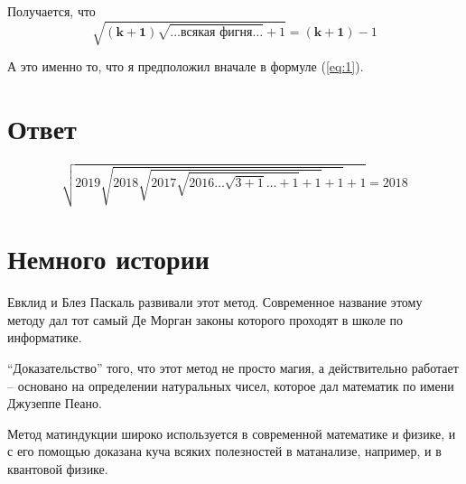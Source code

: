 \documentclass{article}
\begin{document}
Получается, что 
$$\sqrt{\boldsymbol{(k+1)}{}\sqrt{\text{\ldots{}всякая фигня\ldots{}}}+1}=\boldsymbol{(k+1)}-1$$

А это именно то, что я предположил вначале в формуле (\ref{eq:1}).

\section{Ответ}
$$\sqrt{2019{}\sqrt{2018\sqrt{2017\sqrt{2016\dots\sqrt{3+1}\dots+1}+1}+1}+1}=2018$$

\section{Немного истории}
Евклид и Блез Паскаль развивали этот метод. Современное название этому методу дал тот самый Де Морган законы которого проходят в школе по информатике.

``Доказательство'' того, что этот метод не просто магия, а действительно работает -- основано на определении натуральных чисел, которое дал математик по имени Джузеппе Пеано.

Метод матиндукции широко используется в современной математике и физике, и с его помощью доказана куча всяких полезностей в матанализе, например, и в квантовой физике.
\end{document}
